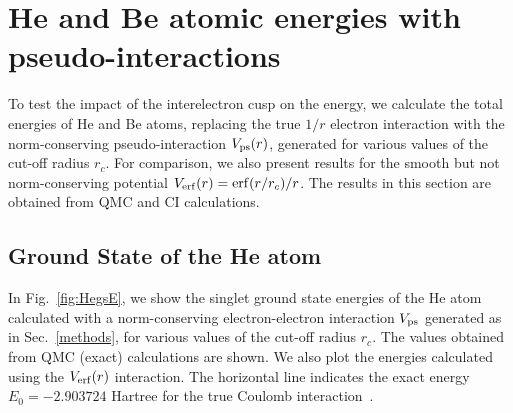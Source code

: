 %
%
\section{H\lowercase{e} and B\lowercase{e} atomic energies with pseudo-interactions}
\label{results}
%
%

To test the impact of the interelectron cusp on the energy, 
we calculate the total energies of He and Be atoms, replacing 
the true $1/r$ electron interaction with the norm-conserving 
pseudo-interaction $V_{\rm ps}(r)$, generated for various values 
of the cut-off radius $r_c$.
For comparison, we also present results for the smooth but not 
norm-conserving potential $V_{\rm erf}(r) = {\rm erf}(r/r_c)/r$. 
The results in this section are obtained from QMC and CI calculations. 

%
%
\subsection{Ground State of the He atom}
%
%

In Fig.~\ref{fig:HegsE}, we show
the singlet ground state energies of the He atom calculated 
with a norm-conserving electron-electron interaction $V_{\rm ps}$ 
generated as in Sec.~\ref{methods}, for various values of the 
cut-off radius $r_c$.
The values obtained from QMC (exact) calculations are shown.
%
%
We also plot the energies calculated using the $V_{\rm erf}(r)$ interaction.
The horizontal line indicates the exact energy $E_0 = -2.903724$ Hartree 
for the true Coulomb interaction~\cite{Davidson}. 

%
%

